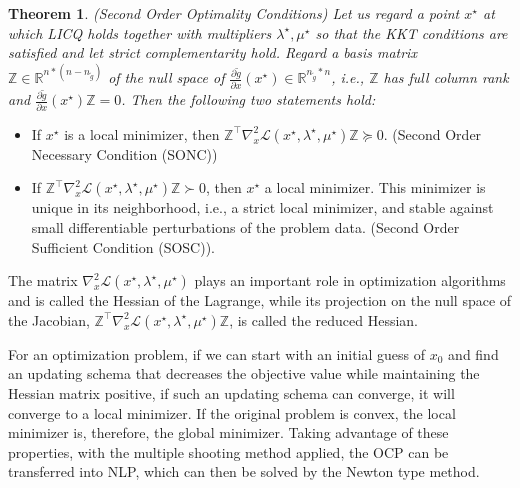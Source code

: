 \documentclass  [
  paper    = a4,
  BCOR     = 10mm,
  twoside,
  fontsize = 12pt,
  fleqn,
  toc      = bibnumbered,
  toc      = listofnumbered,
  numbers  = noendperiod,
  headings = normal,
  listof   = leveldown,
  version  = 3.03
]                                       {scrreprt}
\newcommand{\<}{\langle}
\renewcommand{\>}{\rangle}
\newtheorem{theorem}{Theorem}
\begin{document}
\begin{theorem}(Second Order Optimality Conditions) Let us regard a point $x^\star$ at which LICQ holds together with
	multipliers $\lambda^\star, \mu^\star$ so that the KKT conditions are satisfied and let strict complementarity hold. Regard a basis matrix $\mathbb{Z} \in  \mathbb{R}^{n*(n-n_{\tilde{g}})}$ of the null space of $\frac{\partial \tilde{g}}{\partial x} (x^\star) \in \mathbb{R}^{n_{\tilde{g}} *n}$, i.e., $\mathbb{Z}$ has full column rank and $\frac{\partial \tilde{g}}{\partial x} (x^\star)\mathbb{Z} =0$. Then the following two statements hold:
\end{theorem}
\begin{itemize}
	\item  If $x^\star$ is a local minimizer, then $\mathbb{Z}^\top \nabla_x^2 \mathcal{L}(x^\star, \lambda^\star, \mu^\star)\mathbb{Z} \succeq 0 $. (Second Order Necessary Condition (SONC))
	\item  If $\mathbb{Z}^\top \nabla_x^2 \mathcal{L}(x^\star, \lambda^\star, \mu^\star)\mathbb{Z} \succ 0 $, then $x^\star$ a local minimizer. This minimizer is unique in its neighborhood, i.e., a strict local minimizer, and stable against small differentiable perturbations of the problem data. (Second Order Sufficient Condition (SOSC)).
\end{itemize}


The matrix $\nabla_x^2 \mathcal{L}(x^\star, \lambda^\star, \mu^\star)$ plays an important role in optimization algorithms and is called the Hessian of the Lagrange, while its projection on the null space of the Jacobian, $\mathbb{Z}^\top \nabla_x^2 \mathcal{L}(x^\star, \lambda^\star, \mu^\star)\mathbb{Z}$, is called the reduced Hessian. 

For an optimization problem, if we can start with an initial guess of $x_0$ and find an updating schema that decreases the objective value while maintaining the Hessian matrix positive, if such an updating schema can converge, it will converge to a local minimizer. If the original problem is convex, the local minimizer is, therefore, the global minimizer. Taking advantage of these properties, with the multiple shooting method applied, the OCP can be transferred into NLP, which can then be solved by the Newton type method.
\end{document}
